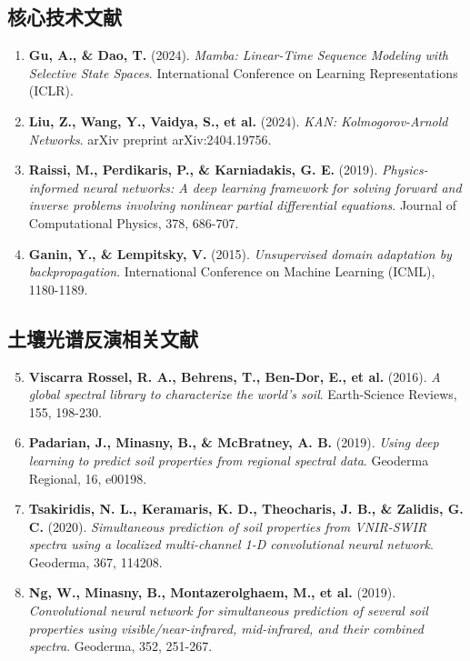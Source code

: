 \documentclass[12pt, a4paper]{article}
\begin{document}
\subsection{核心技术文献}
\begin{enumerate}
    \item \textbf{Gu, A., \& Dao, T.} (2024). \textit{Mamba: Linear-Time Sequence Modeling with Selective State Spaces}. International Conference on Learning Representations (ICLR).
    
    \item \textbf{Liu, Z., Wang, Y., Vaidya, S., et al.} (2024). \textit{KAN: Kolmogorov-Arnold Networks}. arXiv preprint arXiv:2404.19756.
    
    \item \textbf{Raissi, M., Perdikaris, P., \& Karniadakis, G. E.} (2019). \textit{Physics-informed neural networks: A deep learning framework for solving forward and inverse problems involving nonlinear partial differential equations}. Journal of Computational Physics, 378, 686-707.
    
    \item \textbf{Ganin, Y., \& Lempitsky, V.} (2015). \textit{Unsupervised domain adaptation by backpropagation}. International Conference on Machine Learning (ICML), 1180-1189.
\end{enumerate}

\subsection{土壤光谱反演相关文献}
\begin{enumerate}
    \setcounter{enumi}{4}
    \item \textbf{Viscarra Rossel, R. A., Behrens, T., Ben-Dor, E., et al.} (2016). \textit{A global spectral library to characterize the world's soil}. Earth-Science Reviews, 155, 198-230.
    
    \item \textbf{Padarian, J., Minasny, B., \& McBratney, A. B.} (2019). \textit{Using deep learning to predict soil properties from regional spectral data}. Geoderma Regional, 16, e00198.
    
    \item \textbf{Tsakiridis, N. L., Keramaris, K. D., Theocharis, J. B., \& Zalidis, G. C.} (2020). \textit{Simultaneous prediction of soil properties from VNIR-SWIR spectra using a localized multi-channel 1-D convolutional neural network}. Geoderma, 367, 114208.
    
    \item \textbf{Ng, W., Minasny, B., Montazerolghaem, M., et al.} (2019). \textit{Convolutional neural network for simultaneous prediction of several soil properties using visible/near-infrared, mid-infrared, and their combined spectra}. Geoderma, 352, 251-267.
\end{enumerate}
\end{document}
